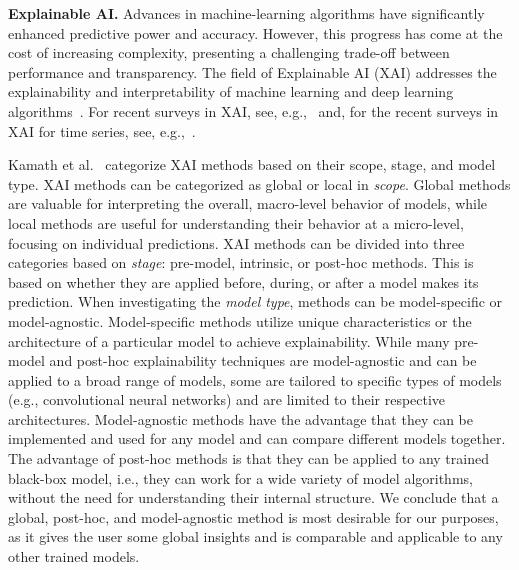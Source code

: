 \noindent
\textbf{Explainable AI.}
Advances in machine-learning algorithms have significantly enhanced predictive power and accuracy. However, this progress has come at the cost of increasing complexity, presenting a challenging trade-off between performance and transparency. The field of Explainable AI (XAI) addresses the explainability and interpretability of machine learning and deep learning algorithms~\cite{kamath2021explainable}.
For recent surveys in XAI, see, e.g.,~\cite{dwivedi2023explainable, abusitta2024survey, adadi2018peeking} and, for the recent surveys in XAI for time series, see, e.g.,~\cite{theissler2022explainable, zhao2023interpretation}.

Kamath et al.~\cite{kamath2021explainable} categorize XAI methods based on their scope, stage, and model type. 
%
XAI methods can be categorized as global or local in \textit{scope}. Global methods are valuable for interpreting the overall, macro-level behavior of models, while local methods are useful for understanding their behavior at a micro-level, focusing on individual predictions.
%
XAI methods can be divided into three categories based on \textit{stage}: pre-model, intrinsic, or post-hoc methods. This is based on whether they are applied before, during, or after a model makes its prediction. 
When investigating the \textit{model type}, methods can be model-specific or model-agnostic. Model-specific methods utilize unique characteristics or the architecture of a particular model to achieve explainability. While many pre-model and post-hoc explainability techniques are model-agnostic and can be applied to a broad range of models, some are tailored to specific types of models (e.g., convolutional neural networks) and are limited to their respective architectures.
Model-agnostic methods have the advantage that they can be implemented and used for any model and can compare different models together. The advantage of post-hoc methods is that they can be applied to any trained black-box model, i.e., they can work for a wide variety of model algorithms, without the need for understanding their internal structure.
We conclude that a global, post-hoc, and model-agnostic method is most desirable for our purposes, as it gives the user some global insights and is comparable and applicable to any other trained models. 


